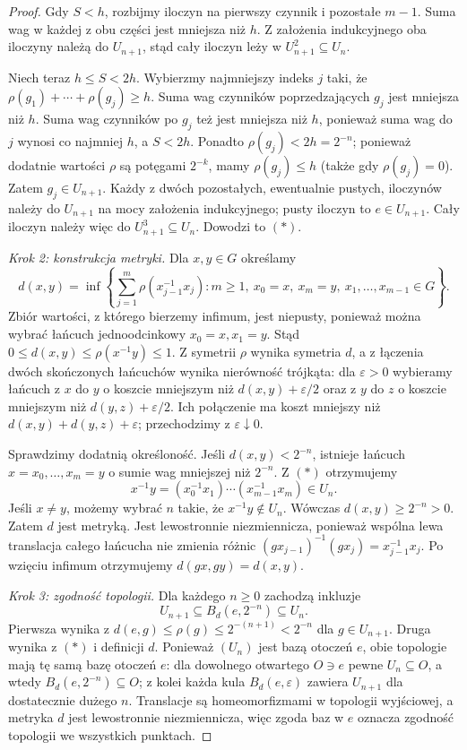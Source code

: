 \begin{proof}
Gdy \(S<h\), rozbijmy iloczyn
na pierwszy czynnik i pozostałe \(m-1\).
Suma wag w każdej z obu części
jest mniejsza niż \(h\).
Z założenia indukcyjnego
oba iloczyny należą do \(U_{n+1}\),
stąd cały iloczyn leży w
\(U_{n+1}^2\subseteq U_n\).

Niech teraz \(h\le S<2h\).
Wybierzmy najmniejszy indeks \(j\)
taki, że
\(\rho(g_1)+\cdots+\rho(g_j)\ge h\).
Suma wag czynników poprzedzających \(g_j\)
jest mniejsza niż \(h\).
Suma wag czynników po \(g_j\)
też jest mniejsza niż \(h\),
ponieważ suma wag do \(j\) wynosi
co najmniej \(h\), a \(S<2h\).
Ponadto \(\rho(g_j)<2h=2^{-n}\);
ponieważ dodatnie wartości \(\rho\)
są potęgami \(2^{-k}\),
mamy \(\rho(g_j)\le h\)
(także gdy \(\rho(g_j)=0\)).
Zatem \(g_j\in U_{n+1}\).
Każdy z dwóch pozostałych,
ewentualnie pustych, iloczynów
należy do \(U_{n+1}\)
na mocy założenia indukcyjnego;
pusty iloczyn to \(e\in U_{n+1}\).
Cały iloczyn należy więc do
\(U_{n+1}^3\subseteq U_n\).
Dowodzi to \((*)\).

\emph{Krok 2: konstrukcja metryki.}
Dla \(x,y\in G\) określamy
\[
 d(x,y)=\inf\left\{
 \sum_{j=1}^{m}\rho(x_{j-1}^{-1}x_j):
 m\ge1,\ x_0=x,\ x_m=y,\
 x_1,\ldots,x_{m-1}\in G
 \right\}.
\]
Zbiór wartości, z którego bierzemy infimum,
jest niepusty, ponieważ można wybrać
łańcuch jednoodcinkowy \(x_0=x,x_1=y\).
Stąd \(0\le d(x,y)\le\rho(x^{-1}y)\le1\).
Z symetrii \(\rho\) wynika symetria \(d\),
a z łączenia dwóch skończonych łańcuchów
wynika nierówność trójkąta:
dla \(\varepsilon>0\) wybieramy
łańcuch z \(x\) do \(y\) o koszcie
mniejszym niż \(d(x,y)+\varepsilon/2\)
oraz z \(y\) do \(z\) o koszcie
mniejszym niż \(d(y,z)+\varepsilon/2\).
Ich połączenie ma koszt mniejszy
niż \(d(x,y)+d(y,z)+\varepsilon\);
przechodzimy z \(\varepsilon\downarrow0\).

Sprawdzimy dodatnią określoność.
Jeśli \(d(x,y)<2^{-n}\),
istnieje łańcuch \(x=x_0,\ldots,x_m=y\)
o sumie wag mniejszej niż \(2^{-n}\).
Z \((*)\) otrzymujemy
\[
 x^{-1}y=
 (x_0^{-1}x_1)\cdots(x_{m-1}^{-1}x_m)
 \in U_n.
\]
Jeśli \(x\neq y\), możemy wybrać \(n\)
takie, że \(x^{-1}y\notin U_n\).
Wówczas \(d(x,y)\ge2^{-n}>0\).
Zatem \(d\) jest metryką.
Jest lewostronnie niezmiennicza,
ponieważ wspólna lewa translacja
całego łańcucha nie zmienia różnic
\((gx_{j-1})^{-1}(gx_j)=x_{j-1}^{-1}x_j\).
Po wzięciu infimum otrzymujemy
\(d(gx,gy)=d(x,y)\).

\emph{Krok 3: zgodność topologii.}
Dla każdego \(n\ge0\) zachodzą inkluzje
\[
 U_{n+1}\subseteq
 B_d(e,2^{-n})\subseteq U_n.
\]
Pierwsza wynika z
\(d(e,g)\le\rho(g)\le2^{-(n+1)}<2^{-n}\)
dla \(g\in U_{n+1}\).
Druga wynika z \((*)\) i definicji \(d\).
Ponieważ \((U_n)\) jest bazą otoczeń \(e\),
obie topologie mają tę samą bazę otoczeń \(e\):
dla dowolnego otwartego \(O\ni e\)
pewne \(U_n\subseteq O\),
a wtedy \(B_d(e,2^{-n})\subseteq O\);
z kolei każda kula \(B_d(e,\varepsilon)\)
zawiera \(U_{n+1}\) dla dostatecznie dużego \(n\).
Translacje są homeomorfizmami
w topologii wyjściowej,
a metryka \(d\) jest lewostronnie
niezmiennicza, więc zgoda baz w \(e\)
oznacza zgodność topologii we wszystkich punktach.
\end{proof}

